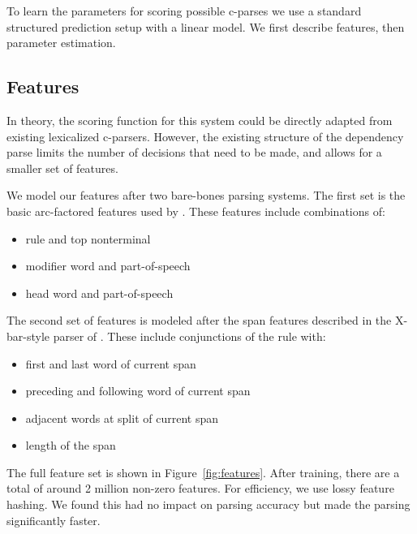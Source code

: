 \documentclass[11pt,letterpaper]{article}
\begin{document}
To learn the parameters for scoring possible c-parses we use a standard
structured prediction setup with a linear model. We first describe
features, then parameter estimation.


\subsection{Features}

In theory, the scoring function for this system could be directly
adapted from existing lexicalized c-parsers. However, the existing structure of
the dependency parse limits the number of decisions that need to be
made, and allows for a smaller set of features.

We model our features after two bare-bones parsing systems. 
The first set is the basic arc-factored features 
used by . These features include combinations of:
\begin{itemize}
\item rule and top nonterminal
\item modifier word and part-of-speech
\item head word and part-of-speech
\end{itemize}

The second set of features is modeled after the span features
described in the X-bar-style parser of . These
include conjunctions of the rule with:
\begin{itemize}
\item first and last word of current span
\item preceding and following word of current span
\item adjacent words at split of current span
\item length of the span
\end{itemize}

The full feature set is shown in Figure~\ref{fig:features}.  After
training, there are a total of around 2 million non-zero features.
For efficiency, we use lossy feature hashing. We found this had no
impact on parsing accuracy but made the parsing significantly faster.
\end{document}
